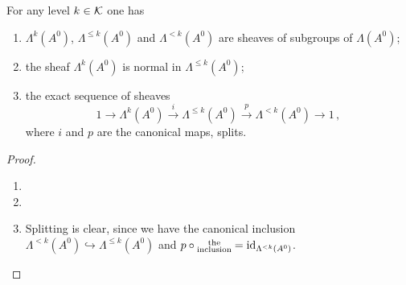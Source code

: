 \begin{comment}
  See \cite[I.5]{Loday1994} on p.\ 861f (See [LR91])
\end{comment}
\begin{prop}
  For any level $k\in\mathcal{K}$ one has
  \begin{enumerate}
    \item $\Lambda^{k}(A^0)$, $\Lambda^{\leq k}(A^0)$ and $\Lambda^{<k}(A^0)$
      are sheaves of subgroups of $\Lambda(A^0)$;
    \item the sheaf $\Lambda^k(A^0)$ is normal in $\Lambda^{\leq k}(A^0)$;
      \begin{comment}
        A subgroup $N$ is normal in $G$ ($N\vartriangleleft G$) if it is stable
        under conjugation, i.e.
        \[
          N\vartriangleleft G \Leftrightarrow \forall n\in N \forall g\in G,
          gng^{-1}\in N ,.
        \]
      \end{comment}
    \item {}
      the exact sequence of sheaves
      \[
        1\longrightarrow\Lambda^k(A^0)
        \overset{i}\longrightarrow\Lambda^{\leq k}(A^0)
        \overset{p}\longrightarrow\Lambda^{<k}(A^0)
        \longrightarrow 1 \,,
      \]
      where $i$ and $p$ are the canonical maps, splits.
  \end{enumerate}
\end{prop}
\begin{proof}
  \begin{enumerate}
    \item \TODO{}
    \item \TODO{}
    \item Splitting is clear, since we have the canonical inclusion
      $\Lambda^{<k}(A^0)\hookrightarrow\Lambda^{\leq k}(A^0)$ and
      $p\circ\substack{\text{the}\\\text{inclusion}}=\operatorname{id}_{\Lambda^{<k}(A^0)}$.
  \end{enumerate}
\end{proof}
